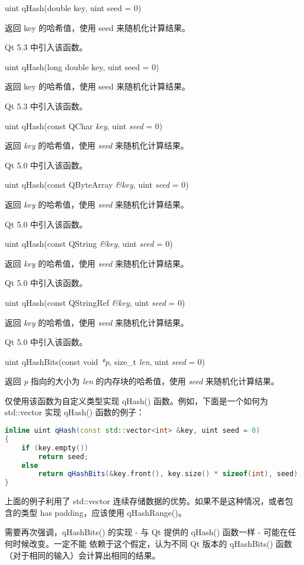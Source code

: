 uint qHash(double key, uint seed = 0)

返回 key 的哈希值，使用 seed 来随机化计算结果。

Qt 5.3 中引入该函数。

uint qHash(long double key, uint seed = 0)

返回 key 的哈希值，使用 seed 来随机化计算结果。

Qt 5.3 中引入该函数。

uint qHash(const QChar \emph{key}, uint \emph{seed} = 0)

返回 \emph{key} 的哈希值，使用 \emph{seed} 来随机化计算结果。

Qt 5.0 中引入该函数。

uint qHash(const QByteArray \emph{\&key},  uint \emph{seed} = 0)

返回 \emph{key} 的哈希值，使用 \emph{seed} 来随机化计算结果。

Qt 5.0 中引入该函数。

uint qHash(const QString \emph{\&key}, uint \emph{seed} = 0)

返回 \emph{key} 的哈希值，使用 \emph{seed} 来随机化计算结果。

Qt 5.0 中引入该函数。

uint qHash(const QStringRef \emph{\&key}, uint \emph{seed} = 0)

返回 \emph{key} 的哈希值，使用 \emph{seed} 来随机化计算结果。

Qt 5.0 中引入该函数。

uint qHashBits(const void \emph{*p}, size\_t \emph{len}, uint \emph{seed} = 0)

返回 \emph{p} 指向的大小为 \emph{len} 的内存块的哈希值，使用 \emph{seed} 来随机化计算结果。

仅使用该函数为自定义类型实现 qHash() 函数。例如，下面是一个如何为 std::vector 实现 qHash() 函数的例子：


\begin{lstlisting}[language=C++]
inline uint qHash(const std::vector<int> &key, uint seed = 0)
{
    if (key.empty())
        return seed;
    else
        return qHashBits(&key.front(), key.size() * sizeof(int), seed);
}
\end{lstlisting}

上面的例子利用了 std::vector 连续存储数据的优势。如果不是这种情况，或者包含的类型 has padding，应该使用 qHashRange()。

需要再次强调，qHashBits() 的实现 - 与 Qt 提供的 qHash() 函数一样 - 可能在任何时候改变。一定不能 依赖于这个假定，认为不同 Qt 版本的 qHashBits() 函数（对于相同的输入）会计算出相同的结果。

